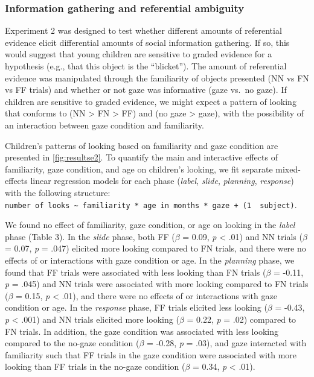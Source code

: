 \documentclass[english,,man]{apa6}
\begin{document}
\subsubsection{Information gathering and referential
ambiguity}\label{information-gathering-and-referential-ambiguity}

Experiment 2 was designed to test whether different amounts of
referential evidence elicit differential amounts of social information
gathering. If so, this would suggest that young children are sensitive
to graded evidence for a hypothesis (e.g., that this object is the
\enquote{blicket}). The amount of referential evidence was manipulated
through the familiarity of objects presented (NN vs FN vs FF trials) and
whether or not gaze was informative (gaze vs.~no gaze). If children are
sensitive to graded evidence, we might expect a pattern of looking that
conforms to (NN \textgreater{} FN \textgreater{} FF) and (no gaze
\textgreater{} gaze), with the possibility of an interaction between
gaze condition and familiarity.

Children's patterns of looking based on familiarity and gaze condition
are presented in \ref{fig:resultse2}. To quantify the main and
interactive effects of familiarity, gaze condition, and age on
children's looking, we fit separate mixed-effects linear regression
models for each phase (\emph{label}, \emph{slide}, \emph{planning},
\emph{response}) with the following structure:
\texttt{number\ of\ looks\ \textasciitilde{}\ familiarity\ *\ age\ in\ months\ *\ gaze\ +\ (1\ \textbar{}\ subject)}.

We found no effect of familiarity, gaze condition, or age on looking in
the \emph{label} phase (Table 3). In the \emph{slide} phase, both FF
(\(\beta\) = 0.09, \emph{p} \textless{} .01) and NN trials (\(\beta\) =
0.07, \emph{p} = .047) elicited more looking compared to FN trials, and
there were no effects of or interactions with gaze condition or age. In
the \emph{planning} phase, we found that FF trials were associated with
less looking than FN trials (\(\beta\) = -0.11, \emph{p} = .045) and NN
trials were associated with more looking compared to FN trials
(\(\beta\) = 0.15, \emph{p} \textless{} .01), and there were no effects
of or interactions with gaze condition or age. In the \emph{response}
phase, FF trials elicited less looking (\(\beta\) = -0.43, \emph{p}
\textless{} .001) and NN trials elicited more looking (\(\beta\) = 0.22,
\emph{p} = .02) compared to FN trials. In addition, the gaze condition
was associated with less looking compared to the no-gaze condition
(\(\beta\) = -0.28, \emph{p} = .03), and gaze interacted with
familiarity such that FF trials in the gaze condition were associated
with more looking than FF trials in the no-gaze condition (\(\beta\) =
0.34, \emph{p} \textless{} .01).
\end{document}
